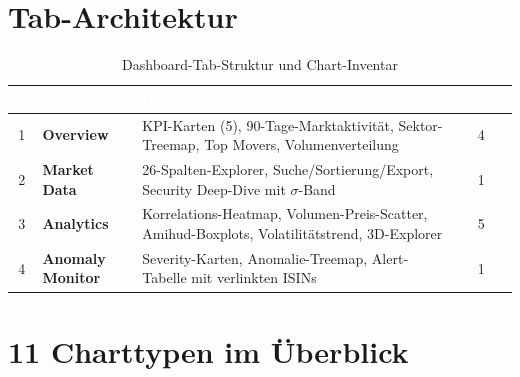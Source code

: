 \documentclass[11pt, a4paper, oneside, openany]{report}
\begin{document}
\section{Tab-Architektur}

\begin{table}[H]
\centering
\caption{Dashboard-Tab-Struktur und Chart-Inventar}
\label{tab:tabs}
\sffamily\small
\begin{tabularx}{\textwidth}{c >{\bfseries}l X c}
  \toprule
  \rowcolor{DeepNavy} \textcolor{white}{\#} & \textcolor{white}{\textbf{Tab}} & \textcolor{white}{\textbf{Inhalt}} & \textcolor{white}{\textbf{Charts}} \\
  \midrule
  1 & Overview       & KPI-Karten (5), 90-Tage-Marktaktivität, Sektor-Treemap, Top Movers, Volumenverteilung & 4 \\
  2 & Market Data    & 26-Spalten-Explorer, Suche/Sortierung/Export, Security Deep-Dive mit $\sigma$-Band & 1 \\
  3 & Analytics      & Korrelations-Heatmap, Volumen-Preis-Scatter, Amihud-Boxplots, Volatilitätstrend, 3D-Explorer & 5 \\
  4 & Anomaly Monitor & Severity-Karten, Anomalie-Treemap, Alert-Tabelle mit verlinkten ISINs & 1 \\
  \bottomrule
\end{tabularx}
\end{table}

\section{11 Charttypen im Überblick}
\end{document}
